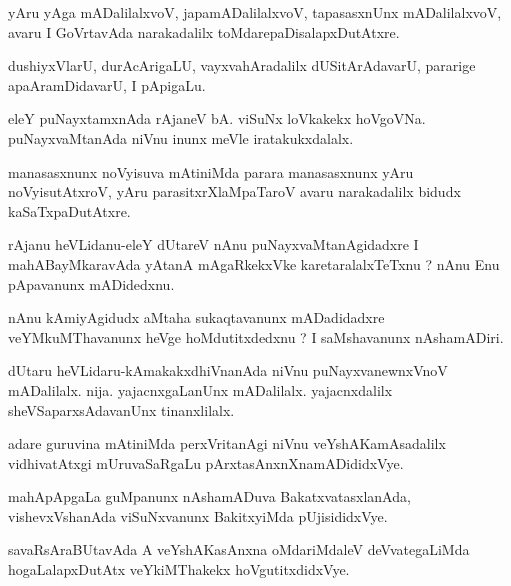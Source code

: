 \documentclass{article}
\begin{document}
\begin{mn}%
yAru yAga mADalilalxvoV, japamADalilalxvoV, tapasasxnUnx mADalilalxvoV, avaru I GoVrtavAda 
narakadalilx toMdarepaDisalapxDutAtxre.
\end{mn}

\begin{mn}%
dushiyxVlarU, durAcArigaLU, vayxvahAradalilx dUSitArAdavarU, pararige apaAramDidavarU, I 
pApigaLu.
\end{mn}

\begin{mn}%
eleY puNayxtamxnAda rAjaneV bA. viSuNx loVkakekx hoVgoVNa. puNayxvaMtanAda niVnu inunx 
meVle iratakukxdalalx.
\end{mn}

\begin{mn}%
manasasxnunx noVyisuva mAtiniMda parara manasasxnunx yAru noVyisutAtxroV, yAru 
parasitxrXlaMpaTaroV avaru narakadalilx bidudx kaSaTxpaDutAtxre.
\end{mn}

\begin{mn}%
rAjanu heVLidanu-eleY dUtareV nAnu puNayxvaMtanAgidadxre I mahABayMkaravAda yAtanA 
mAgaRkekxVke karetaralalxTeTxnu ? nAnu  Enu pApavanunx mADidedxnu.
\end{mn}

\begin{mn}%
nAnu kAmiyAgidudx aMtaha sukaqtavanunx mADadidadxre veYMkuMThavanunx heVge hoMdutitxdedxnu 
? I saMshavanunx nAshamADiri.
\end{mn}

\begin{mn}%
dUtaru heVLidaru-kAmakakxdhiVnanAda niVnu puNayxvanewnxVnoV mADalilalx. nija. 
yajacnxgaLanUnx mADalilalx. yajacnxdalilx sheVSaparxsAdavanUnx tinanxlilalx.
\end{mn}

\begin{mn}%
adare guruvina mAtiniMda perxVritanAgi niVnu veYshAKamAsadalilx vidhivatAtxgi 
mUruvaSaRgaLu pArxtasAnxnXnamADididxVye.
\end{mn}

\begin{mn}%
mahApApgaLa guMpanunx nAshamADuva BakatxvatasxlanAda, vishevxVshanAda viSuNxvanunx 
BakitxyiMda pUjisididxVye.
\end{mn}

\begin{mn}%
savaRsAraBUtavAda A veYshAKasAnxna oMdariMdaleV deVvategaLiMda hogaLalapxDutAtx 
veYkiMThakekx hoVgutitxdidxVye.
\end{mn}
\end{document}
